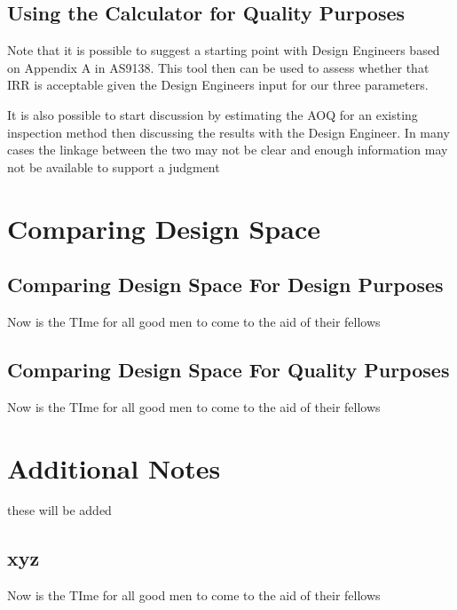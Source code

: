 \documentclass[
]{article}
\begin{document}
\subsection{Using the Calculator for Quality Purposes}\label{using-the-calculator-for-quality-purposes}

Note that it is possible to suggest a starting point with Design Engineers based on Appendix A in AS9138. This tool then can be used to assess whether that IRR is acceptable given the Design Engineers input for our three parameters.

It is also possible to start discussion by estimating the AOQ for an existing inspection method then discussing the results with the Design Engineer. In many cases the linkage between the two may not be clear and enough information may not be available to support a judgment

\section{Comparing Design Space}\label{comparing-design-space}

\subsection{Comparing Design Space For Design Purposes}\label{comparing-design-space-for-design-purposes}

Now is the TIme for all good men to come to the aid of their fellows

\subsection{Comparing Design Space For Quality Purposes}\label{comparing-design-space-for-quality-purposes}

Now is the TIme for all good men to come to the aid of their fellows

\section{Additional Notes}\label{additional-notes}

these will be added

\subsection{xyz}\label{xyz}

Now is the TIme for all good men to come to the aid of their fellows
\end{document}

